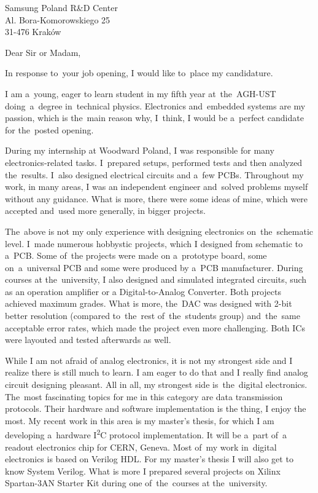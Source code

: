 \documentclass[a4paper, 12pt]{letter}
\begin{document}
\begin{letter}{Samsung Poland R\&D Center\\Al. Bora-Komorowskiego 25\\31-476 Kraków}
\address{Maciej Kopeć\\Brogi~40/107\\31-431~Kraków}

\opening{Dear Sir or Madam,}

In response to~your job opening, I would like to~place my candidature.

I am a~young, eager to learn student in my fifth year at~the~AGH-UST doing~a~degree in~technical physics. Electronics and~embedded systems are my passion, which is the~main reason why, I~think, I would be a~perfect candidate for the~posted opening.

During my internship at Woodward Poland, I was responsible for many electronics-related tasks. I~prepared setups, performed tests and then analyzed the~results. I~also designed electrical circuits and a~few PCBs. Throughout my work, in many areas, I was an independent engineer and~solved problems myself without any guidance. What is more, there were some ideas of mine, which were accepted and~used more generally, in bigger projects.

The~above is not my only experience with designing electronics on~the~schematic level. I~made numerous hobbystic projects, which I designed from schematic to a~PCB. Some of~the projects were made on a~prototype board, some on~a~universal PCB and some were produced by a~PCB manufacturer. During courses at the~university, I also designed and simulated integrated circuits, such as an operation amplifier or a Digital-to-Analog Converter. Both projects achieved maximum grades. What is more, the~DAC was designed with 2-bit better resolution (compared to~the~rest of~the~students group) and~the~same acceptable error rates, which made the project even more challenging. Both ICs were layouted and tested afterwards as well.

While I am not afraid of analog electronics, it is not my strongest side and I realize there is still much to learn. I am eager to do that and I really find analog circuit designing pleasant. All in all, my strongest side is~the~digital electronics. The~most fascinating topics for me in this category are data transmission protocols. Their hardware and software implementation is the thing, I enjoy the most. My recent work in this area is my master's thesis, for which I am developing a~hardware I\textsuperscript{2}C protocol implementation. It will be a~part of~a readout electronics chip for CERN, Geneva. Most of~my work in~digital electronics is based on Verilog HDL. For my master's thesis I will also get to know System Verilog. What is more I prepared several projects on Xilinx Spartan-3AN Starter Kit during one of~the~courses at the~university.


\end{letter}
\end{document}
